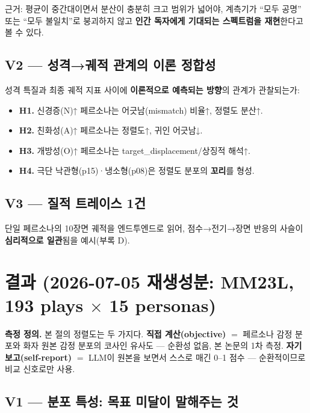 \documentclass[11pt, a4paper]{article}
\begin{document}
근거: 평균이 중간대이면서 분산이 충분히 크고 범위가 넓어야, 계측기가 ``모두 공명'' 또는 ``모두 불일치''로 붕괴하지 않고 \textbf{인간 독자에게 기대되는 스펙트럼을 재현}한다고 볼 수 있다.

\subsection{V2 --- 성격→궤적 관계의 이론 정합성}

성격 특질과 최종 궤적 지표 사이에 \textbf{이론적으로 예측되는 방향}의 관계가 관찰되는가:

\begin{itemize}
  \item \textbf{H1.} 신경증(N)↑ 페르소나는 어긋남(mismatch) 비율↑, 정렬도 분산↑.
  \item \textbf{H2.} 친화성(A)↑ 페르소나는 정렬도↑, 귀인 어긋남↓.
  \item \textbf{H3.} 개방성(O)↑ 페르소나는 target\_displacement/상징적 해석↑.
  \item \textbf{H4.} 극단 낙관형(p15)·냉소형(p08)은 정렬도 분포의 \textbf{꼬리}를 형성.
\end{itemize}

\subsection{V3 --- 질적 트레이스 1건}

단일 페르소나의 10장면 궤적을 엔드투엔드로 읽어, 점수→전기→장면 반응의 사슬이 \textbf{심리적으로 일관}됨을 예시(부록 D).

\section{결과 (2026-07-05 재생성분: MM23L, 193 plays $\times$ 15 personas)}

\noindent\textbf{측정 정의.} 본 절의 정렬도는 두 가지다. \textbf{직접 계산(objective)} $=$ 페르소나 감정 분포와 화자 원본 감정 분포의 코사인 유사도 --- 순환성 없음, 본 논문의 1차 측정. \textbf{자기보고(self-report)} $=$ LLM이 원본을 보면서 스스로 매긴 0--1 점수 --- 순환적이므로 비교 신호로만 사용.

\subsection{V1 --- 분포 특성: 목표 미달이 말해주는 것}
\end{document}
